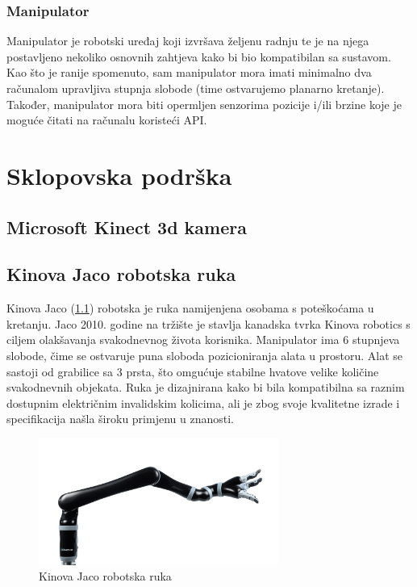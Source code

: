 \documentclass[times, utf8, diplomski, numeric]{fer}
\begin{document}
\subsection{Manipulator}
Manipulator je robotski uređaj koji izvršava željenu radnju te je na njega postavljeno nekoliko osnovnih zahtjeva kako bi bio kompatibilan sa sustavom.
Kao što je ranije spomenuto, sam manipulator mora imati minimalno dva računalom upravljiva stupnja slobode (time ostvarujemo planarno kretanje).
Također, manipulator mora biti opermljen senzorima pozicije i/ili brzine koje je moguće čitati na računalu koristeći API.

\chapter{Sklopovska podrška}

\section{Microsoft Kinect 3d kamera}

\section{Kinova Jaco robotska ruka}
Kinova Jaco (\ref{JACO2}) robotska je ruka namijenjena osobama s poteškoćama u kretanju.
Jaco 2010. godine na tržište je stavlja kanadska tvrka Kinova robotics s ciljem olakšavanja svakodnevnog života korisnika.
Manipulator ima 6 stupnjeva slobode, čime se ostvaruje puna sloboda pozicioniranja alata u prostoru.
Alat se sastoji od grabilice sa 3 prsta, što omgućuje stabilne hvatove velike količine svakodnevnih objekata.
Ruka je dizajnirana kako bi bila kompatibilna sa raznim dostupnim električnim invalidskim kolicima, ali je zbog svoje kvalitetne izrade i specifikacija našla široku primjenu u znanosti.

\begin{figure}[h!]
\centering
\includegraphics[width = 0.7\textwidth]{JACO2}
\caption{Kinova Jaco robotska ruka} \label{JACO2}
\end{figure}
\end{document}
